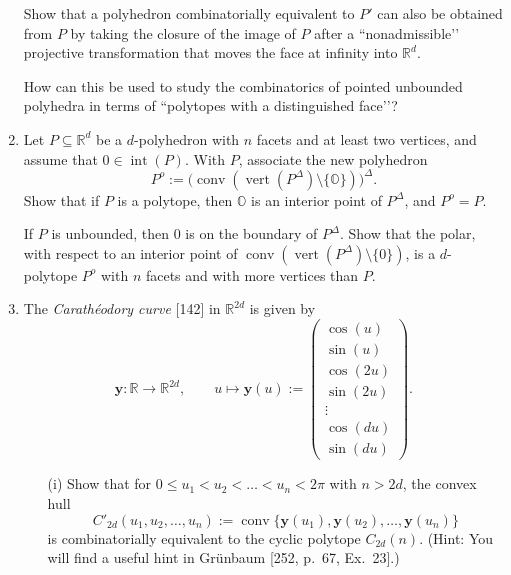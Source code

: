 \documentclass{article}
\begin{document}
\begin{enumerate}
Show that a polyhedron combinatorially equivalent to $P'$ can also be obtained from $P$ by taking the closure of the image of $P$ after a “nonadmissible’’ projective transformation that moves the face at infinity into $\mathbb{R}^d$.

How can this be used to study the combinatorics of pointed unbounded polyhedra in terms of “polytopes with a distinguished face’’?

\item Let $P \subseteq \mathbb{R}^d$ be a $d$-polyhedron with $n$ facets and at least two vertices, and assume that $0 \in \operatorname{int}(P)$. With $P$, associate the new polyhedron
\[
  P^o := \bigl(\operatorname{conv}(\operatorname{vert}(P^\Delta)\setminus\{\mathds{O}\})\bigr)^\Delta .
\]
Show that if $P$ is a polytope, then $\mathds{O}$ is an interior point of $P^\Delta$, and $P^o = P$.

If $P$ is unbounded, then $0$ is on the boundary of $P^\Delta$. Show that the polar, with respect to an interior point of $\operatorname{conv}(\operatorname{vert}(P^\Delta)\setminus\{0\})$, is a $d$-polytope $P^o$ with $n$ facets and with more vertices than $P$.

\item The \emph{Carathéodory curve} [142] in $\mathbb{R}^{2d}$ is given by
\[
  \mathbf{y} : \mathbb{R} \longrightarrow \mathbb{R}^{2d}, \qquad
  u \longmapsto \mathbf{y}(u) :=
  \begin{pmatrix}
    \cos(u)\\
    \sin(u)\\
    \cos(2u)\\
    \sin(2u)\\
    \vdots\\
    \cos(du)\\
    \sin(du)
  \end{pmatrix}.
\]
\begin{enumerate}
\item[(i)] Show that for $0 \le u_1 < u_2 < \dots < u_n < 2\pi$ with $n > 2d$, the convex hull
\[
  C'_{2d}(u_1,u_2,\dots,u_n) :=
  \operatorname{conv}\{\mathbf{y}(u_1),\mathbf{y}(u_2),\dots,\mathbf{y}(u_n)\}
\]
is combinatorially equivalent to the cyclic polytope $C_{2d}(n)$.
(Hint: You will find a useful hint in Grünbaum [252, p.\ 67, Ex.\ 23].)


\end{enumerate}
\end{enumerate}
\end{document}
